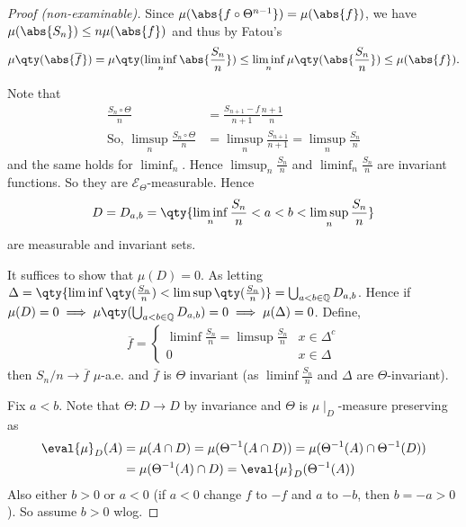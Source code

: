 \begin{proof}[Proof (non-examinable)]
	Since $\mu(\abs{f \circ \Theta^{n-1}}) = \mu(\abs{f})$, we have $\mu(\abs{S_n}) \leq n \mu(\abs{f})$ and thus by Fatou's
    \begin{align*}
        \mu\qty(\abs{\overline f}) = \mu\qty(\liminf_n \abs{\frac{S_n}{n}}) \leq \liminf_n \mu\qty(\abs{\frac{S_n}{n}}) \leq \mu(\abs{f}).
    \end{align*}

    Note that
    \begin{align*}
		\frac{S_n \circ \Theta}{n} &= \frac{S_{n+1} - f}{n + 1} \frac{n + 1}{n} \\
        \text{So, } \limsup_n \frac{S_n \circ \Theta}{n} &= \limsup_n \frac{S_{n+1}}{n+1} = \limsup_n \frac{S_n}{n}
    \end{align*}
    and the same holds for $\liminf_n$.
    Hence $\limsup_n \frac{S_n}{n}$ and $\liminf_n \frac{S_n}{n}$ are invariant functions.
    So they are $\mathcal E_\Theta$-measurable.
    Hence
    \begin{align*}
        D = D_{a,b} = \qty{\liminf_n \frac{S_n}{n} < a < b < \limsup_n \frac{S_n}{n}}
    \end{align*}
    are measurable and invariant sets.

	It suffices to show that $\mu(D) = 0$.
	As letting $\Delta = \qty{\liminf \qty(\frac{S_n}{n}) < \limsup \qty(\frac{S_n}{n})} = \bigcup_{a < b \in \mathbb{Q}} D_{a, b}$.
	Hence if $\mu(D) = 0 \implies \mu\qty(\bigcup_{a < b \in \mathbb{Q}} D_{a, b}) = 0 \implies \mu(\Delta) = 0$.
	Define,
	\begin{align*}
		\overline f = \begin{cases}
			\liminf \frac{S_n}{n} = \limsup \frac{S_n}{n} & x \in \Delta^c \\
			0 & x \in \Delta
		\end{cases}
	\end{align*}
	then $S_n/n \to \overline f$ $\mu$-a.e. and $\overline f$ is $\Theta$ invariant (as $\liminf \frac{S_n}{n}$ and $\Delta$ are $\Theta$-invariant).

	Fix $a < b$.
	Note that $\Theta : D \to D$ by invariance and $\Theta$ is $\mu \mid_D$-measure preserving as
	\begin{align*}
        \eval{\mu}_D(A) &= \mu(A \cap D) = \mu(\Theta^{-1}(A \cap D)) = \mu(\Theta^{-1}(A) \cap \Theta^{-1}(D)) \\
		&= \mu(\Theta^{-1}(A) \cap D) = \eval{\mu}_D(\Theta^{-1}(A))
    \end{align*}
	Also either $b > 0$ or $a < 0$ (if $a < 0$ change $f$ to $-f$ and $a$ to $-b$, then $b = -a > 0$).
	So assume $b > 0$ wlog.


\end{proof}
